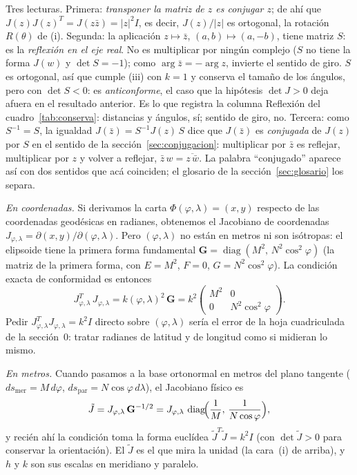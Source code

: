 Tres lecturas. Primera: \emph{transponer la matriz de \(z\) es conjugar \(z\)}; de ahí que
\(J(z)J(z)^T=J(z\bar z)=\lvert z\rvert^2I\), es decir, \(J(z)/\lvert z\rvert\) es ortogonal, la
rotación \(R(\theta)\) de (i). Segunda: la aplicación \(z\mapsto\bar z\), \((a,b)\mapsto(a,-b)\),
tiene matriz \(S\): es la \emph{reflexión en el eje real}. No es multiplicar por ningún
complejo (\(S\) no tiene la forma \(J(w)\) y \(\det S=-1\)); como \(\arg\bar z=-\arg z\),
invierte el sentido de giro. \(S\) es ortogonal, así que cumple (iii) con \(k=1\) y conserva
el tamaño de los ángulos, pero con \(\det S<0\): es \emph{anticonforme}, el caso que la
hipótesis \(\det J>0\) deja afuera en el resultado anterior. Es lo que registra la columna
Reflexión del cuadro~\ref{tab:conserva}: distancias y ángulos, sí; sentido de giro, no.
Tercera: como \(S^{-1}=S\), la igualdad \(J(\bar z)=S^{-1}J(z)\,S\) dice que \(J(\bar z)\) es
\emph{conjugada} de \(J(z)\) por \(S\) en el sentido de la sección~\ref{sec:conjugacion}:
multiplicar por \(\bar z\) es reflejar, multiplicar por \(z\) y volver a reflejar,
\(\bar z\,w=\overline{z\,\bar w}\). La palabra \enquote{conjugado} aparece así con dos sentidos que
acá coinciden; el glosario de la sección~\ref{sec:glosario} los separa.

\begin{atencion}[¿Sobre qué Jacobiano pedimos \(J^TJ=k^2I\)? Coordenadas \((\varphi,\lambda)\) vs.\ metros en el plano tangente]
\emph{En coordenadas.} Si derivamos la carta \(\Phi(\varphi,\lambda)=(x,y)\) respecto de las
coordenadas geodésicas en radianes, obtenemos el Jacobiano de coordenadas
\(J_{\varphi,\lambda}=\partial(x,y)/\partial(\varphi,\lambda)\). Pero \((\varphi,\lambda)\) no
están en metros ni son isótropas: el elipsoide tiene la primera forma fundamental
\(\mathbf G=\operatorname{diag}(M^2,\,N^2\cos^2\varphi)\) (la matriz de la primera forma, con
\(E=M^2\), \(F=0\), \(G=N^2\cos^2\varphi\)). La condición exacta de conformidad es
entonces
\[
  J_{\varphi,\lambda}^T\,J_{\varphi,\lambda}=k(\varphi,\lambda)^2\,\mathbf G
  =k^2\begin{pmatrix}M^2&0\\0&N^2\cos^2\varphi\end{pmatrix}.
\]
Pedir \(J_{\varphi,\lambda}^TJ_{\varphi,\lambda}=k^2I\) directo sobre \((\varphi,\lambda)\)
sería el error de la hoja cuadriculada de la sección~0: tratar radianes de latitud y de
longitud como si midieran lo mismo.

\emph{En metros.} Cuando pasamos a la base ortonormal en metros del plano tangente
(\(ds_{\text{mer}}=M\,d\varphi\), \(ds_{\text{par}}=N\cos\varphi\,d\lambda\)), el Jacobiano
físico es
\[
  \tilde J=J_{\varphi,\lambda}\,\mathbf G^{-1/2}
  =J_{\varphi,\lambda}\,\operatorname{diag}\!\Bigl(\frac1M,\,\frac1{N\cos\varphi}\Bigr),
\]
y recién ahí la condición toma la forma euclídea \(\tilde J^T\tilde J=k^2I\) (con
\(\det\tilde J>0\) para conservar la orientación). El \(\tilde J\) es el que mira la unidad
(la cara~(i) de arriba), y \(h\) y \(k\) son sus escalas en meridiano y paralelo.
\end{atencion}

